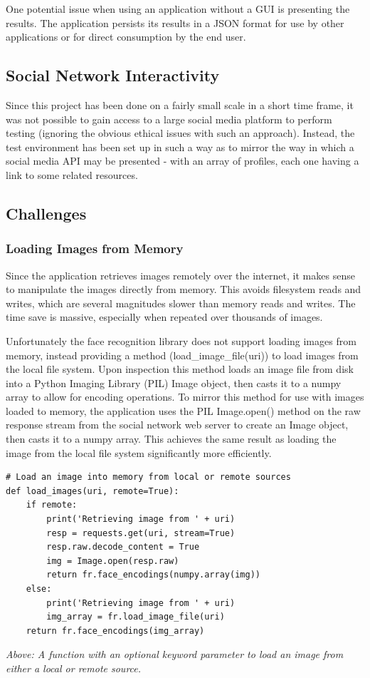 \documentclass[12pt]{article}
\begin{document}
One potential issue when using an application without a GUI is presenting the results. The application persists its results in a JSON format for use by other applications or for direct consumption by the end user.

\subsection{Social Network Interactivity}
Since this project has been done on a fairly small scale in a short time frame, it was not possible to gain access to a large social media platform to perform testing (ignoring the obvious ethical issues with such an approach). Instead, the test environment has been set up in such a way as to mirror the way in which a social media API may be presented - with an array of profiles, each one having a link to some related resources.

\subsection{Challenges}
\subsubsection{Loading Images from Memory}
Since the application retrieves images remotely over the internet, it makes sense to manipulate the images directly from memory. This avoids filesystem reads and writes, which are several magnitudes slower than memory reads and writes. The time save is massive, especially when repeated over thousands of images.

Unfortunately the face recognition library does not support loading images from memory, instead providing a method (load\_image\_file(uri)) to load images from the local file system. Upon inspection this method loads an image file from disk into a Python Imaging Library (PIL) Image object, then casts it to a numpy array to allow for encoding operations. To mirror this method for use with images loaded to memory, the application uses the PIL Image.open() method on the raw response stream from the social network web server to create an Image object, then casts it to a numpy array. This achieves the same result as loading the image from the local file system significantly more efficiently.

\begin{lstlisting}
# Load an image into memory from local or remote sources
def load_images(uri, remote=True):
    if remote:
        print('Retrieving image from ' + uri)
        resp = requests.get(uri, stream=True)
        resp.raw.decode_content = True
        img = Image.open(resp.raw)
        return fr.face_encodings(numpy.array(img))
    else:
        print('Retrieving image from ' + uri)
        img_array = fr.load_image_file(uri)
    return fr.face_encodings(img_array)
\end{lstlisting}
\textit{Above: A function with an optional keyword parameter to load an image from either a local or remote source.}
\end{document}
